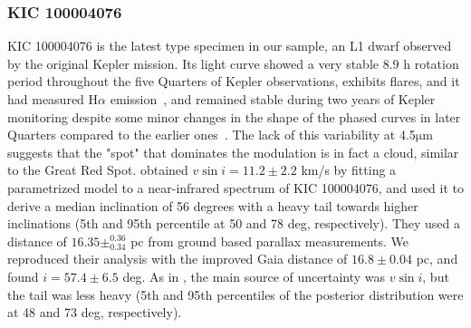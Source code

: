 \documentclass[fleqn,usenatbib,letters]{mnras}%
\newcommand{\FE}{KIC 100004076} %
\begin{document}
\subsubsection{\FE}
\label{sec:propsE}
\FE\; is the latest type specimen in our sample, an L1 dwarf observed by the original Kepler mission. Its light curve showed a very stable 8.9 h rotation period throughout the five Quarters of Kepler observations, exhibits flares, and it had measured H$\alpha$ emission~\citep{gizis2013}, and remained stable during two years of Kepler monitoring despite some minor changes in the shape of the phased curves in later Quarters compared to the earlier ones~\citep{gizis2015}. The lack of this variability at 4.5$\mathrm{\mu}$m suggests that the "spot" that dominates the modulation is in fact a cloud, similar to the Great Red Spot\citep{gizis2015}. \citet{gizis2013} obtained $v\sin i = 11.2\pm2.2$ km/s by fitting a parametrized model to a near-infrared spectrum of \FE, and used it to derive a median inclination of 56 degrees with a heavy tail towards higher inclinations (5th and 95th percentile at 50 and 78 deg, respectively). They used a distance of $16.35 \pm^{0.36}_{0.34}$ pc from ground based parallax measurements. We reproduced their analysis with the improved Gaia distance of $16.8\pm0.04$ pc, and found $i=57.4 \pm 6.5$ deg. As in \citet{gizis2013}, the main source of uncertainty was $v\sin i$, but the tail was less heavy (5th and 95th percentiles of the posterior distribution were at 48 and 73 deg, respectively).

\end{document}
